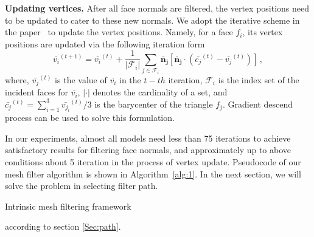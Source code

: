  {\bfseries Updating vertices.} After all face normals are filtered, the vertex positions need to be updated to cater to these new normals.
 We adopt the iterative scheme in the paper~\cite{sun2007fast} to update the vertex positions.
 Namely, for a face $f_{i}$, its vertex positions are updated via the following iteration form
 \begin{equation}
 \label{vertexupdate}
 \bar{v_{i}}^{(t+1)} = \bar{v_{i}}^{(t)} + \frac{1}{|{\mathcal{F}_{i}}|}\sum_{j\in\mathcal{F}_{i}}\mathbf{\bar{n}_{j}}[\mathbf{\bar{n}_{j}}\cdot(\bar{c_{j}}^{(t)}-\bar{v_{j}}^{(t)})]\, ,
 \end{equation}
 where, $\bar{v_{j}}^{(t)}$ is the value of $\bar{v_{i}}$ in the $t-th$ iteration,
 $\mathcal{F}_{i}$ is the index set of the incident faces for $\bar{v_{i}}$,
 $|\cdot|$ denotes the cardinality of a set,
 and $\bar{c_{j}}^{(t)} = \sum_{i=1}^{3}\bar{v_{j_{i}}}^{(t)}/3$ is the barycenter of the triangle $f_{j}$.
 Gradient descend process can be used to solve this formulation.

 In our experiments, almost all models need less than 75 iterations to achieve satisfactory results for filtering face normals,
 and approximately up to above conditions about 5 iteration in the process of vertex update.
 Pseudocode of our mesh filter algorithm is shown in Algorithm~\ref{alg:1}.
 In the next section, we will solve the problem in selecting filter path.


\begin{algorithm}\caption{Intrinsic mesh filtering framework}
\label{alg:1}
\begin{algorithmic}
 according to section \ref{Sec:path}.
\end{algorithmic}
\end{algorithm}




